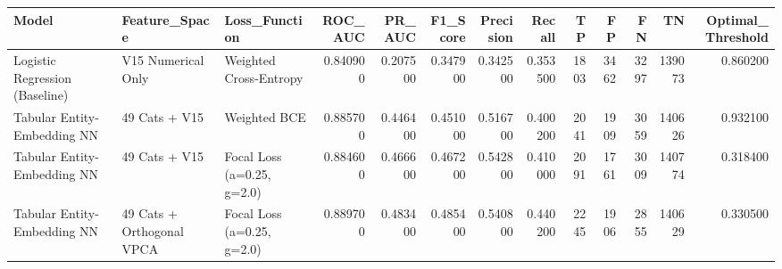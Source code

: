\begin{tabular}{lllrrrrrrrrrr}
\toprule
Model & Feature_Space & Loss_Function & ROC_AUC & PR_AUC & F1_Score & Precision & Recall & TP & FP & FN & TN & Optimal_Threshold \\
\midrule
Logistic Regression (Baseline) & V15 Numerical Only & Weighted Cross-Entropy & 0.840900 & 0.207500 & 0.347900 & 0.342500 & 0.353500 & 1803 & 3462 & 3297 & 139073 & 0.860200 \\
Tabular Entity-Embedding NN & 49 Cats + V15 & Weighted BCE & 0.885700 & 0.446400 & 0.451000 & 0.516700 & 0.400200 & 2041 & 1909 & 3059 & 140626 & 0.932100 \\
Tabular Entity-Embedding NN & 49 Cats + V15 & Focal Loss (a=0.25, g=2.0) & 0.884600 & 0.466600 & 0.467200 & 0.542800 & 0.410000 & 2091 & 1761 & 3009 & 140774 & 0.318400 \\
Tabular Entity-Embedding NN & 49 Cats + Orthogonal VPCA & Focal Loss (a=0.25, g=2.0) & 0.889700 & 0.483400 & 0.485400 & 0.540800 & 0.440200 & 2245 & 1906 & 2855 & 140629 & 0.330500 \\
\bottomrule
\end{tabular}
